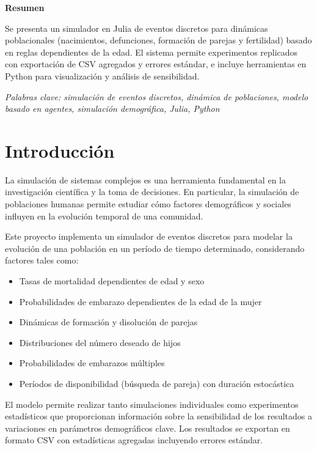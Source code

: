 \documentclass[12pt, a4paper, spanish]{report}
\begin{document}

\textbf{Resumen}

Se presenta un simulador en Julia de eventos discretos para dinámicas poblacionales (nacimientos, defunciones, formación de parejas y fertilidad) basado en reglas dependientes de la edad. El sistema permite experimentos replicados con exportación de CSV agregados y errores estándar, e incluye herramientas en Python para visualización y análisis de sensibilidad.


\textit{Palabras clave: simulación de eventos discretos, dinámica de poblaciones, modelo basado en agentes, simulación demográfica, Julia, Python}


\chapter*{Introducción}
{}

La simulación de sistemas complejos es una herramienta fundamental en la investigación científica y la toma de decisiones. En particular, la simulación de poblaciones humanas permite estudiar cómo factores demográficos y sociales influyen en la evolución temporal de una comunidad.

Este proyecto implementa un simulador de eventos discretos para modelar la evolución de una población en un período de tiempo determinado, considerando factores tales como:

\begin{itemize}
    \item Tasas de mortalidad dependientes de edad y sexo
    \item Probabilidades de embarazo dependientes de la edad de la mujer
    \item Dinámicas de formación y disolución de parejas
    \item Distribuciones del número deseado de hijos
    \item Probabilidades de embarazos múltiples
    \item Períodos de disponibilidad (búsqueda de pareja) con duración estocástica
\end{itemize}

El modelo permite realizar tanto simulaciones individuales como experimentos estadísticos que proporcionan información sobre la sensibilidad de los resultados a variaciones en parámetros demográficos clave. Los resultados se exportan en formato CSV con estadísticas agregadas incluyendo errores estándar.
\end{document}
